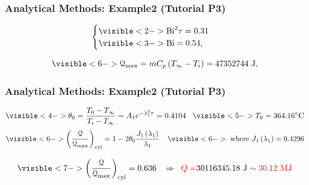 \documentclass[10pt,compress,unknownkeysallowed]{beamer}
\begin{document}
\begin{frame}
 \frametitle{Analytical Methods: Example2 (Tutorial P3)}

    \begin{displaymath}
        \begin{cases}
            \visible<2->{\Bi^{2}\tau = 0.31 } \\
            \visible<3->{\Bi = 0.54, }  
        \end{cases}
    \end{displaymath}

    \begin{displaymath}
       \visible<6->{\mathcal{Q}_{\text{max}} = mC_{p}\left(T_{\infty}-T_{i}\right) = 47352744\text{ J},}
    \end{displaymath}
    \medskip


\end{frame}

\begin{frame}
 \frametitle{Analytical Methods: Example2 (Tutorial P3)}

    \medskip

    \medskip

    \begin{displaymath}
       \visible<4->{\theta_{0} = \frc{T_{0}-T_{\infty}}{T_{i}-T_{\infty}} = A_{1}e^{-\lambda_{1}^{2}\tau} = 0.4104}\;\;\;\visible<5->{T_{0}=364.16^{\circ}\text{C}}
    \end{displaymath}
    \begin{displaymath}
       \visible<6->{\left(\frc{\mathcal{Q}}{\mathcal{Q}_{\text{max}}}\right)_{\text{cyl}} = 1 - 2\theta_{0}\frc{J_{1}\left(\lambda_{1}\right)}{\lambda_{1}}}\;\;\;\;\visible<6->{\text{ where } J_{1}\left(\lambda_{1}\right) = 0.4296 }
    \end{displaymath}

    \begin{displaymath}
       \visible<7->{\left(\frc{\mathcal{Q}}{\mathcal{Q}_{\text{max}}}\right)_{\text{cyl}} = 0.636\;\;\;\Rightarrow\;\; \red{Q = } 30116345.18\text{ J} \sim \red{30.12\text{ MJ}}}
    \end{displaymath}
    

\end{frame}
\end{document}
